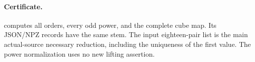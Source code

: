 \paragraph{Certificate.}
computes all orders, every odd power, and the complete
cube map.  Its JSON/NPZ records have the same stem.
The input eighteen-pair list is the main actual-source
necessary reduction, including the uniqueness of the
first value.  The power normalization uses no new
lifting assertion.

